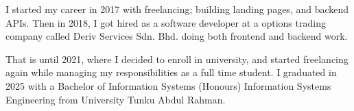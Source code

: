 

\begin{cvparagraph}

I started my career in 2017 with freelancing; building landing pages, and backend APIs. Then in 2018, I got hired as a software developer at a options trading company called Deriv Services Sdn. Bhd. doing both frontend and backend work. 

That is until 2021, where I decided to enroll in university, and started freelancing again while managing my responsibilities as a full time student. I graduated in 2025 with a Bachelor of Information Systems (Honours) Information Systems Engineering from University Tunku Abdul Rahman.

\end{cvparagraph}
